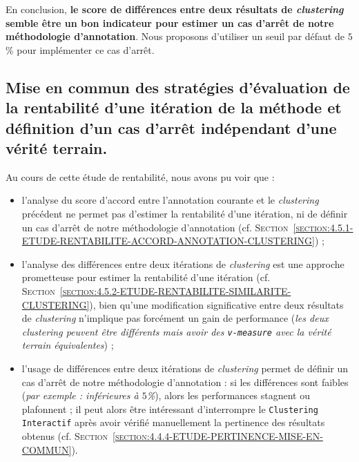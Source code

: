 			En conclusion, \textbf{le score de différences entre deux résultats de \textit{clustering} semble être un bon indicateur pour estimer un cas d'arrêt de notre méthodologie d'annotation}.
			Nous proposons d'utiliser un seuil par défaut de $5$\% pour implémenter ce cas d'arrêt.
			
	\subsection{Mise en commun des stratégies d'évaluation de la rentabilité d'une itération de la méthode et définition d'un cas d'arrêt indépendant d'une vérité terrain.}
	\label{section:4.5.3-ETUDE-RENTABILITE-MISE-EN-COMMUN}
			
		\begin{leftBarSummary}
			Au cours de cette étude de rentabilité, nous avons pu voir que :
			\begin{itemize}
				\item[\itemko] l'analyse du score d'accord entre l'annotation courante et le \textit{clustering} précédent ne permet pas d'estimer la rentabilité d'une itération, ni de définir un cas d'arrêt de notre méthodologie d'annotation (cf. \textsc{Section~\ref{section:4.5.1-ETUDE-RENTABILITE-ACCORD-ANNOTATION-CLUSTERING}}) ;
				\item[\itemok] l'analyse des différences entre deux itérations de \textit{clustering} est une approche prometteuse pour estimer la rentabilité d'une itération (cf. \textsc{Section~\ref{section:4.5.2-ETUDE-RENTABILITE-SIMILARITE-CLUSTERING}}), bien qu'une modification significative entre deux résultats de \textit{clustering} n'implique pas forcément un gain de performance (\textit{les deux \textit{clustering} peuvent être différents mais avoir des \texttt{v-measure} avec la vérité terrain équivalentes}) ;
				\item[\itemok] l'usage de différences entre deux itérations de \textit{clustering} permet de définir un cas d'arrêt de notre méthodologie d'annotation : si les différences sont faibles (\textit{par exemple : inférieures à $5$\%}), alors les performances stagnent ou plafonnent ; il peut alors être intéressant d'interrompre le \texttt{Clustering Interactif} après avoir vérifié manuellement la pertinence des résultats obtenus (cf. \textsc{Section~\ref{section:4.4.4-ETUDE-PERTINENCE-MISE-EN-COMMUN}}).
			\end{itemize}
		\end{leftBarSummary}
		
